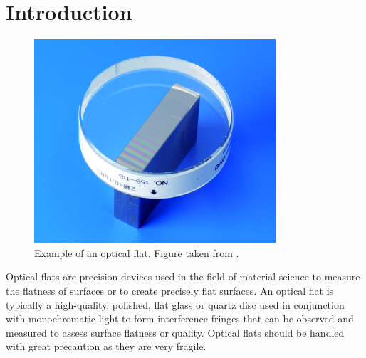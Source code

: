 \documentclass[../main.tex]{subfiles}
\begin{document}
\chapter{Introduction}

\vspace{-5pt}

\begin{minipage}{\textwidth}
\begin{figure}[H]%
    \centering
    \includegraphics[width=0.8\textwidth]{Images/Introduction/optical_flat}
    \vspace{-8pt}
    \caption{Example of an optical flat. Figure taken from \cite{optical_flat_mitutoyo}.}
    \label{fig:optical_flat_example}
\end{figure}
Optical flats are precision devices used in the field of material science to measure the flatness of surfaces or to create precisely flat surfaces. An optical flat is typically a high-quality, polished, flat glass or quartz disc used in conjunction with monochromatic light to form interference fringes that can be observed and measured to assess surface flatness or quality. Optical flats should be handled with great precaution as they are very fragile. \cite{Toru_2017, edmund_optics_optical_flats, kemet_optical_flats, lapmaster_wolters_optical_flats,Paschottaoptical_flats}
\end{minipage}
\end{document}
